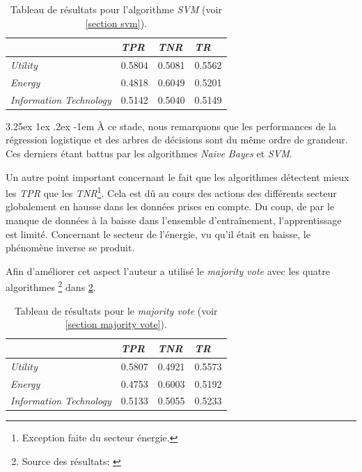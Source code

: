 \documentclass[a4paper, 11pt]{article}
\makeatletter
\renewcommand\paragraph{\@startsection{paragraph}{5}{\z@}%
  {3.25ex \@plus1ex \@minus.2ex}%
  {-1em}%
  {\normalfont\normalsize\bfseries}}
\makeatother
\begin{document}
\begin{table}[H]
	\centering
\begin{tabular}{|l|l|l|l|}
	\hline
	\ & \textit{TPR} & \textit{TNR} & \textit{TR}\\
	\hline
	\textit{Utility} & 0.5804 & 0.5081 & 0.5562 \\
	\hline
	\textit{Energy} & 0.4818 & 0.6049 & 0.5201\\
	\hline
	\textit{Information Technology} & 0.5142 & 0.5040 & 0.5149\\
	\hline
\end{tabular}
\caption{Tableau de résultats pour l'algorithme \textit{SVM} (voir \ref{section svm}).}
\label{table_svm}
\end{table}


\paragraph{}
À ce stade, nous remarquons que les performances de la régression logistique et des arbres de décisions sont du même
ordre de grandeur. Ces derniers étant battus par les algorithmes \textit{Naive Bayes} et \textit{SVM}.

Un autre point important concernant le fait que les algorithmes détectent mieux les \textit{TPR} que les
\textit{TNR}\footnote{Exception faite du secteur énergie.}. Cela est dû au cours des actions des différents secteur
globalement en hausse dans les données prises en compte. Du coup, de par le manque de données à la baisse dans
l'ensemble d'entraînement, l'apprentissage est limité. Concernant le secteur de l'énergie, vu qu'il était en baisse,
le phénomène inverse se produit.

Afin d'améliorer cet aspect l'auteur a utilisé le \textit{majority vote} avec les quatre algorithmes
\footnote{Source des résultats: \cite{machine_learning_automated_trading}} dans \ref{table_majority_vote}.

\begin{table}[h!]
	\centering
\begin{tabular}{|l|l|l|l|}
	\hline
	\ & \textit{TPR} & \textit{TNR} & \textit{TR}\\
	\hline
	\textit{Utility} & 0.5807 & 0.4921 & 0.5573 \\
	\hline
	\textit{Energy} & 0.4753 & 0.6003 & 0.5192\\
	\hline
	\textit{Information Technology} & 0.5133 & 0.5055 & 0.5233\\
	\hline
\end{tabular}
\caption{Tableau de résultats pour le \textit{majority vote} (voir \ref{section majority vote}).}
\label{table_majority_vote}
\end{table}
\end{document}
